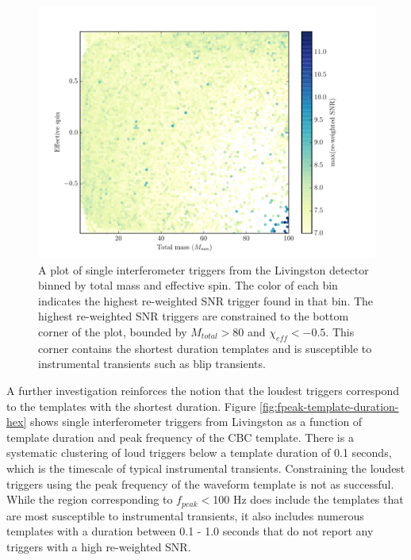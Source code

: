 \begin{figure}[!ht]%
\centering
  \includegraphics[width=\textwidth]{figures/o1-cbc-dq-paper/mtotal-eff-spin-hex}
  \caption[Total mass vs. effective spin in GW150914 analysis]{A plot of single interferometer triggers from the Livingston detector binned by total mass  %
          and effective spin. The color of each bin indicates the highest re-weighted SNR trigger found in that %
          bin. The highest re-weighted SNR triggers are constrained to the bottom corner of the plot, bounded by %
          $M_{total} > 80$ and $\chi_{eff} < -0.5$. This corner contains the shortest duration templates and %
          is susceptible to instrumental transients such as blip transients.}
\label{fig:mtotal-eff-spin-hex}
\end{figure}

A further investigation reinforces the notion that the loudest triggers correspond to the
templates with the shortest duration. Figure \ref{fig:fpeak-template-duration-hex}
shows single interferometer triggers from Livingston as a function of template duration
and peak frequency of the CBC template. There is a systematic clustering of loud triggers below
a template duration of 0.1 seconds, which is the timescale of typical instrumental transients.
Constraining the loudest triggers using the peak frequency of the waveform template is not as successful.
While the region corresponding to $f_{peak} < $100 Hz does include the templates that are most
susceptible to instrumental transients, it also includes numerous templates with a duration
between 0.1 - 1.0 seconds that do not report any triggers with a high re-weighted SNR.

